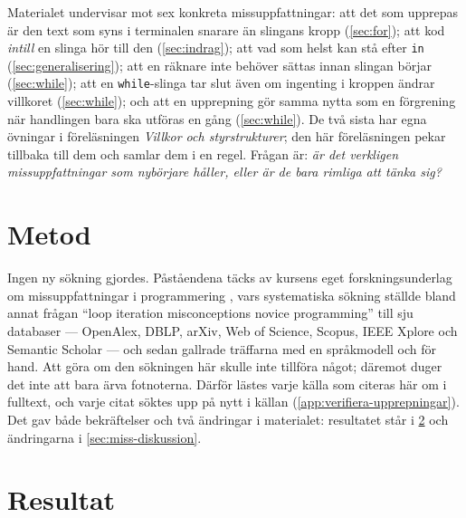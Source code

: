 Materialet undervisar mot sex konkreta missuppfattningar: att det som
upprepas är den text som syns i terminalen snarare än slingans kropp
(\cref{sec:for}); att kod \emph{intill} en slinga hör till den
(\cref{sec:indrag}); att vad som helst kan stå efter
\texttt{in} (\cref{sec:generalisering}); att en räknare inte
behöver sättas innan slingan börjar (\cref{sec:while}); att en
\texttt{while}-slinga tar slut även om ingenting i kroppen
ändrar villkoret (\cref{sec:while}); och att en upprepning gör samma nytta
som en förgrening när handlingen bara ska utföras en gång
(\cref{sec:while}).  De två sista har egna övningar i föreläsningen
\emph{Villkor och styrstrukturer}; den här föreläsningen pekar tillbaka
till dem och samlar dem i en regel.  Frågan är: \emph{är det
verkligen missuppfattningar som nybörjare håller, eller är de bara rimliga
att tänka sig?}

\section{Metod}
\label{sec:miss-metod}

Ingen ny sökning gjordes.  Påståendena täcks av kursens eget
forskningsunderlag om missuppfattningar i programmering
\autocite{SooriBosk2026}, vars systematiska
sökning ställde bland annat frågan \enquote{loop iteration misconceptions
novice programming} till sju databaser --- OpenAlex, DBLP, arXiv, Web of
Science, Scopus, IEEE Xplore och Semantic Scholar --- och sedan gallrade
träffarna med en språkmodell och för hand.  Att göra om den sökningen här
skulle inte tillföra något; däremot duger det inte att bara ärva fotnoterna.
Därför lästes varje källa som citeras här om i fulltext, och varje citat
söktes upp på nytt i källan (\cref{app:verifiera-upprepningar}).  Det gav både
bekräftelser och två ändringar i materialet: resultatet står i
\cref{sec:miss-resultat} och ändringarna i \cref{sec:miss-diskussion}.

\section{Resultat}
\label{sec:miss-resultat}

